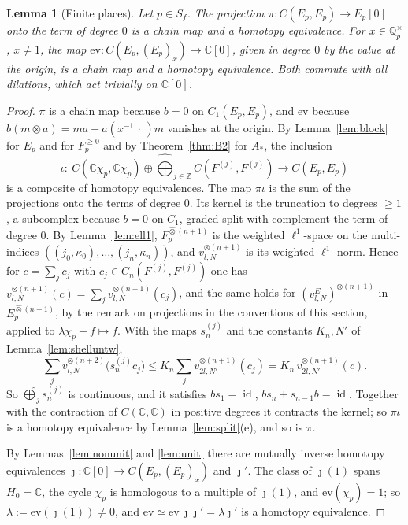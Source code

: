 \documentclass[11pt]{amsart}
\newtheorem{lemma}[theorem]{Lemma}
\theoremstyle{definition}
\theoremstyle{remark}
\newcommand{\C}{\mathbb C}
\newcommand{\Z}{\mathbb Z}
\newcommand{\Q}{\mathbb Q}
\newcommand{\id}{\operatorname{id}}
\begin{document}
\begin{lemma}[Finite places]\label{lem:finuntw}
Let $p\in S_f$.  The projection $\pi:C(E_p,E_p)\to E_p[0]$ onto the term of
degree $0$ is a chain map and a homotopy equivalence.  For $x\in\Q_p^{\times}$,
$x\ne1$, the map $\mathrm{ev}:C(E_p,(E_p)_x)\to\C[0]$, given in degree $0$ by the
value at the origin, is a chain map and a homotopy equivalence.  Both commute
with all dilations, which act trivially on $\C[0]$.
\end{lemma}

\begin{proof}
$\pi$ is a chain map because $b=0$ on $C_1(E_p,E_p)$, and $\mathrm{ev}$ because
$b(m\otimes a)=ma-a(x^{-1}\,\cdot\,)m$ vanishes at the origin.  By
Lemma~\ref{lem:block} for $E_p$ and for $F_p^{\ge0}$ and by
Theorem~\ref{thm:B2} for $A_*$, the inclusion
\[
\iota:\ C(\C\chi_p,\C\chi_p)\oplus\widehat\bigoplus_{j\in\Z}C(F^{(j)},F^{(j)})
\longrightarrow C(E_p,E_p)
\]
is a composite of homotopy equivalences.  The map $\pi\iota$ is the sum of the
projections onto the terms of degree $0$.  Its kernel is the truncation to
degrees $\ge1$, a subcomplex because $b=0$ on $C_1$, graded-split with
complement the term of degree $0$.  By Lemma~\ref{lem:ell1},
$F_p^{\widehat\otimes(n+1)}$ is the weighted $\ell^{1}$-space on the
multi-indices $((j_0,\kappa_0),\dots,(j_n,\kappa_n))$, and
$v_{l,N}^{\otimes(n+1)}$ is its weighted $\ell^{1}$-norm.  Hence for
$c=\sum_jc_j$ with $c_j\in C_n(F^{(j)},F^{(j)})$ one has
$v_{l,N}^{\otimes(n+1)}(c)=\sum_jv_{l,N}^{\otimes(n+1)}(c_j)$, and the same holds
for $(v^{E}_{l,N})^{\otimes(n+1)}$ in $E_p^{\widehat\otimes(n+1)}$, by the
remark on projections in the conventions of this section, applied to
$\lambda\chi_p+f\mapsto f$.  With the maps $s_n^{(j)}$ and the constants $K_n,N'$ of
Lemma~\ref{lem:shelluntw},
\[
\sum_jv_{l,N}^{\otimes(n+2)}\bigl(s_n^{(j)}c_j\bigr)\le
K_n\sum_jv_{2l,N'}^{\otimes(n+1)}(c_j)=K_n\,v_{2l,N'}^{\otimes(n+1)}(c).
\]
So $\widehat\bigoplus_js_n^{(j)}$ is continuous, and it satisfies $bs_1=\id$,
$bs_n+s_{n-1}b=\id$.  Together with the contraction of $C(\C,\C)$ in positive
degrees it contracts the kernel; so $\pi\iota$ is a homotopy equivalence by
Lemma~\ref{lem:split}(e), and so is $\pi$.

By Lemmas~\ref{lem:nonunit} and \ref{lem:unit} there are mutually inverse
homotopy equivalences $\jmath:\C[0]\to C(E_p,(E_p)_x)$ and $\jmath'$.  The
class of $\jmath(1)$ spans $H_0=\C$, the cycle $\chi_p$ is homologous to a
multiple of $\jmath(1)$, and $\mathrm{ev}(\chi_p)=1$; so
$\lambda:=\mathrm{ev}(\jmath(1))\ne0$, and
$\mathrm{ev}\simeq\mathrm{ev}\,\jmath\jmath'=\lambda\jmath'$ is a homotopy
equivalence.
\end{proof}
\end{document}
